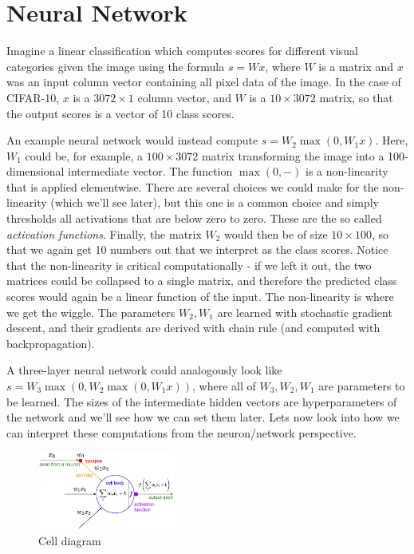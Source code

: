 \chapter{Neural Network}

Imagine a linear classification which computes scores for different visual categories given the image using the formula $s=Wx$, where $W$ is a matrix and $x$ was an input column vector containing all pixel data of the image. In the case of CIFAR-10, $x$ is a $3072 \times 1 $ column vector, and $W$ is a $10 \times 3072$ matrix, so that the output scores is a vector of 10 class scores.

An example neural network would instead compute $s=W_2\max(0,W_1x)$. Here, $W_1$ could be, for example, a $100 \times 3072$ matrix transforming the image into a 100-dimensional intermediate vector. The function $\max(0,−)$ is a non-linearity that is applied elementwise. There are several choices we could make for the non-linearity (which we’ll see later), but this one is a common choice and simply thresholds all activations that are below zero to zero. These are the so called \textit{activation functions}. Finally, the matrix $W_2$ would then be of size $10 \times 100$, so that we again get 10 numbers out that we interpret as the class scores. Notice that the non-linearity is critical computationally - if we left it out, the two matrices could be collapsed to a single matrix, and therefore the predicted class scores would again be a linear function of the input. The non-linearity is where we get the wiggle. The parameters $W_2,W_1$ are learned with stochastic gradient descent, and their gradients are derived with chain rule (and computed with backpropagation).

A three-layer neural network could analogously look like $s=W_3\max(0,W_2\max(0,W_1x))$, where all of $W_3,W_2,W_1$ are parameters to be learned. The sizes of the intermediate hidden vectors are hyperparameters of the network and we’ll see how we can set them later. Lets now look into how we can interpret these computations from the neuron/network perspective.

\begin{figure}[h]
  \centering
  \includegraphics[width=0.4\textwidth]{Images/nn/1.jpeg}
  \caption{Cell diagram}
\end{figure}

